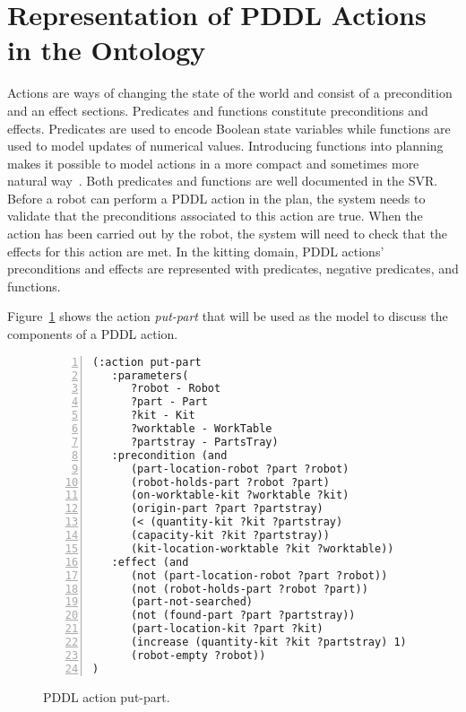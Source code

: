 \section{Representation of PDDL Actions in the Ontology}\label{task1}
Actions are ways of changing the state of the world and consist of a precondition and an effect sections. Predicates and functions constitute preconditions and effects. Predicates are used to encode Boolean state variables while functions are used to model updates of numerical values. Introducing functions into planning makes it possible to model actions in a more compact and sometimes more natural way~\cite{FOX.JAIR.2003}. Both predicates and functions are well documented in the SVR. 
Before a robot can perform a PDDL action in the plan, the system needs to validate that
the preconditions associated to this action are true. When the action has been carried out
by the robot, the system will need to check that the effects for this action are met. In the
kitting domain, PDDL actions' preconditions and effects are represented with predicates,
negative predicates, and functions.

Figure~\ref{fig:put-part} shows the action \textsl{put-part} that will be used as the model to discuss the components of a PDDL action.

\begin{figure}[t!h!]
\centering
\begin{minipage}{.5\paperwidth}
\begin{list}{}{\setlength{\leftmargin}{1em}}\item\small
\begin{Verbatim}[commandchars=\\\{\},fontsize=\small, numbers=left, numbersep=2pt]
(:action put-part
   :parameters(
      ?robot - Robot
      ?part - Part
      ?kit - Kit
      ?worktable - WorkTable
      ?partstray - PartsTray)
   :precondition (and
      (part-location-robot ?part ?robot)
      (robot-holds-part ?robot ?part)
      (on-worktable-kit ?worktable ?kit)
      (origin-part ?part ?partstray)
      (< (quantity-kit ?kit ?partstray)
      (capacity-kit ?kit ?partstray))
      (kit-location-worktable ?kit ?worktable))
   :effect (and
      (not (part-location-robot ?part ?robot))
      (not (robot-holds-part ?robot ?part))
      (part-not-searched)
      (not (found-part ?part ?partstray))
      (part-location-kit ?part ?kit)
      (increase (quantity-kit ?kit ?partstray) 1)
      (robot-empty ?robot))
)
\end{Verbatim}
\end{list}
\end{minipage}
\caption{PDDL action put-part.}
\label{fig:put-part}
\end{figure}

